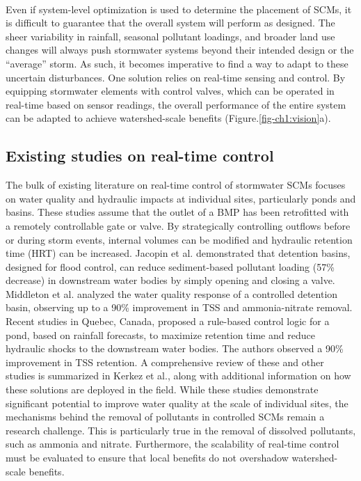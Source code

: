 \

Even if system-level optimization is used to determine the placement of SCMs\cite{Ciou2012OptimizationWatershed,Zhen2004OptimalScale}, it is difficult to guarantee that the overall system will perform as designed.
The sheer variability in rainfall\cite{Chaubey1999UncertaintyRainfall}, seasonal pollutant loadings\cite{Ouyang2006AssessmentQuality}, and broader land use changes\cite{Goonetilleke2005UnderstandingManagement} will always push stormwater systems beyond their intended design or the ``average'' storm\cite{DepartmentofEnvironmentalProtection2006PennsylvaniaManual}.
As such, it becomes imperative to find a way to adapt to these uncertain disturbances.
One solution relies on real-time sensing and control.
By equipping stormwater elements with control valves, which can be operated in real-time based on sensor readings, the overall performance of the entire system can be adapted to achieve watershed-scale benefits (Figure.\ref{fig-ch1:vision}a). 

\subsection{Existing studies on real-time control}

The bulk of existing literature on real-time control of stormwater SCMs focuses on water quality and hydraulic impacts at individual sites, particularly ponds and basins.
These studies assume that the outlet of a BMP has been retrofitted with a remotely controllable gate or valve.
By strategically controlling outflows before or during storm events, internal volumes can be modified and hydraulic retention time (HRT) can be increased.
Jacopin et al.\cite{Jacopin2001OptimisationBasins} demonstrated that detention basins, designed for flood control, can reduce sediment-based pollutant loading (57\% decrease) in downstream water bodies by simply opening and closing a valve.
Middleton et al.\cite{Middleton_2008} analyzed the water quality response of a controlled detention basin, observing up to a 90\% improvement in TSS and ammonia-nitrate removal.
Recent studies\cite{Muschalla2014Ecohydraulic-drivenBasins,
  Gaborit2013ImprovingForecasts,Gaborit2016} in Quebec, Canada,
proposed a rule-based control logic for a pond, based on rainfall forecasts, to
maximize retention time and  reduce hydraulic shocks to the downstream water
bodies. The authors observed a 90\% improvement in TSS retention. A
comprehensive review of these and other studies is summarized in Kerkez et al.\cite{kerkez2016}, along with additional information on how these solutions are deployed in the field. 
While these studies demonstrate significant potential to improve water quality at the scale of individual sites, the mechanisms behind the removal of pollutants in controlled SCMs remain a research challenge. This is particularly true in the removal of dissolved pollutants, such as ammonia and nitrate. Furthermore, the scalability of  real-time control must be evaluated to ensure that local benefits do not overshadow watershed-scale benefits. 

